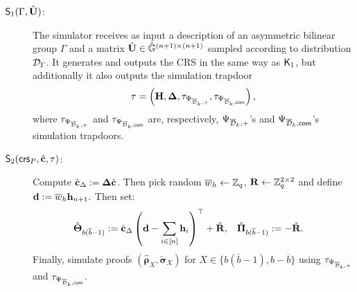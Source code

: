 \begin{description}
%
\item[$\mathsf{S}_1(\Gamma,\hat{\mathbf{{U}}})$:] The simulator receives as input a description of an asymmetric bilinear group $\Gamma$ and a matrix $\hat{\mathbf{{U}}} \in {\ensuremath{\hat{\mathbb{G}}}}^{(n+1) \times (n+1)}$ sampled according to distribution $\mathcal{D}_{\Gamma}$. It generates and outputs the CRS in the same way as $\mathsf{K}_1$, but additionally it also  outputs the simulation trapdoor 
$$\tau=\left(\mathbf{{H}}, \mathbf{{\Delta}}, \tau_{\Psi_{\overline{\mathcal{D}}_k,+}}, \tau_{\Psi_{\overline{\mathcal{D}}_k,\mathsf{com}}}\right),$$
where $\tau_{\Psi_{\overline{\mathcal{D}}_k,+}}$ and $\tau_{\Psi_{\overline{\mathcal{D}}_k,\mathsf{com}}}$ are, respectively, ${\Psi_{\overline{\mathcal{D}}_k,+}}$'s and ${\Psi_{\overline{\mathcal{D}}_k,\mathsf{com}}}$'s simulation trapdoors.
\item[$\mathsf{S}_2(\mathsf{crs}_P,\hat{\mathbf{c}},\tau)$:] Compute $\hat{\mathbf{c}}_{\Delta}:=\mathbf{{\Delta}} \hat{\mathbf{c}}$.
      Then pick random $\overline{w}_h \gets \mathbb{Z}_q$, $\mathbf{{R}} \gets \mathbb{Z}_q^{2 \times 2}$ and define 
 $\mathbf{d}:= \overline{w}_{h} \mathbf{h}_{n+1}.$
 Then set:
\begin{align*} 
{\hat{\mathbf{{\Theta}}}}_{b(\overline{b}-1)} & :=  {\hat{\mathbf{c}}}_\Delta \left(\mathbf{d}-\sum_{i \in [n]} \mathbf{h}_i\right)^\top + {\hat{\mathbf{{R}}}},
    &
    \check{\mathbf{{\Pi}}}_{b(\overline{b}-1)} & := - \check{\mathbf{{R}}}.
\end{align*}
Finally, simulate proofs $(\hat{\boldsymbol \rho}_{X},
  \check{\boldsymbol \sigma}_{X})$
for $X \in \{b(\overline{b}-1),  b-\overline{b}
\}$  using $\tau_{\Psi_{\overline{\mathcal{D}}_k,+}}$ and $\tau_{\Psi_{\overline{\mathcal{D}}_k,\mathsf{com}}}$.
\end{description}

